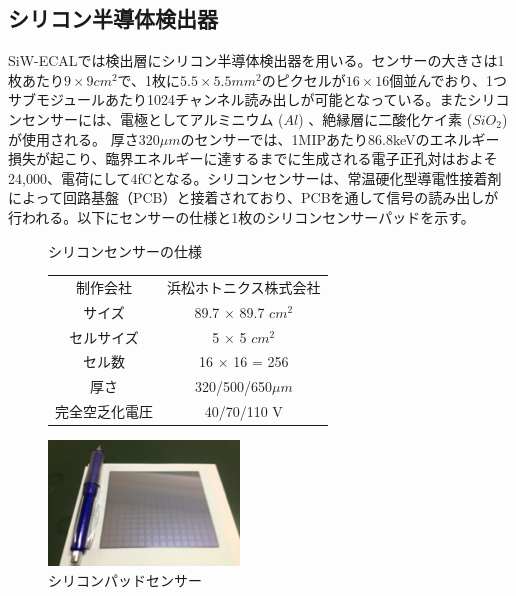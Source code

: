 \subsection{シリコン半導体検出器}
SiW-ECALでは検出層にシリコン半導体検出器を用いる。センサーの大きさは1枚あたり$9 \times 9 {cm}^2$で、1枚に$5.5 \times 5.5 {mm}^2$のピクセルが$16 \times 16$個並んでおり、1つサブモジュールあたり1024チャンネル読み出しが可能となっている。またシリコンセンサーには、電極としてアルミニウム ($Al$) 、絶縁層に二酸化ケイ素 ($SiO_2$)が使用される。 厚さ320$\mu m$のセンサーでは、1MIPあたり86.8keVのエネルギー損失が起こり、臨界エネルギーに達するまでに生成される電子正孔対はおよそ24,000、電荷にして4fCとなる。シリコンセンサーは、常温硬化型導電性接着剤によって回路基盤（PCB）と接着されており、PCBを通して信号の読み出しが行われる。以下にセンサーの仕様と1枚のシリコンセンサーパッドを示す。
\begin{figure}[H]
 \begin{minipage}[h]{.45\linewidth}
 \def\@captype{table}
   \centering
   \caption{シリコンセンサーの仕様}
   \begin{tabular}{|c|c|}
         \hline
   	制作会社 & 浜松ホトニクス株式会社\\
	サイズ & 89.7 $\times$ 89.7 ${cm}^2$ \\
	セルサイズ & 5 $\times$ 5 ${cm}^2$\\
	セル数 & 16 $\times$ 16 = 256\\
	厚さ & 320/500/650$\mu m$\\
	完全空乏化電圧 & 40/70/110 V\\
        \hline
  \end{tabular}
\end{minipage}
\hfill
\begin{minipage}[h]{.45\linewidth}
	\begin{center}
 \includegraphics[keepaspectratio, scale=0.8]
 	{Figure/Siwecal/si_sensor.png}
 		\caption{シリコンパッドセンサー}
 		\label{sensor}
	\end{center}
\end{minipage}
\end{figure}

